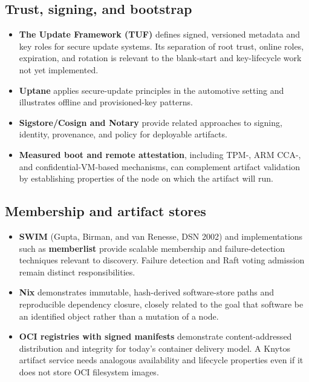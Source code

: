 \subsection{Trust, signing, and bootstrap}

\begin{itemize}
    \item \textbf{The Update Framework (TUF)} defines signed, versioned
        metadata and key roles for secure update systems. Its separation of
        root trust, online roles, expiration, and rotation is relevant to the
        blank-start and key-lifecycle work not yet implemented.

    \item \textbf{Uptane} applies secure-update principles in the automotive
        setting and illustrates offline and provisioned-key patterns.

    \item \textbf{Sigstore/Cosign and Notary} provide related approaches to
        signing, identity, provenance, and policy for deployable artifacts.

    \item \textbf{Measured boot and remote attestation}, including TPM-,
        ARM CCA-, and confidential-VM-based mechanisms, can complement
        artifact validation by establishing properties of the node on which
        the artifact will run.
\end{itemize}

\subsection{Membership and artifact stores}

\begin{itemize}
    \item \textbf{SWIM} (Gupta, Birman, and van Renesse, DSN 2002) and
        implementations such as \textbf{memberlist} provide scalable
        membership and failure-detection techniques relevant to discovery.
        Failure detection and Raft voting admission remain distinct
        responsibilities.

    \item \textbf{Nix} demonstrates immutable, hash-derived software-store
        paths and reproducible dependency closure, closely related to the
        goal that software be an identified object rather than a mutation of
        a node.

    \item \textbf{OCI registries with signed manifests} demonstrate
        content-addressed distribution and integrity for today's container
        delivery model. A Knytos artifact service needs analogous
        availability and lifecycle properties even if it does not store OCI
        filesystem images.
\end{itemize}

